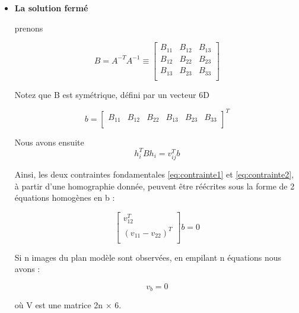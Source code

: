  \begin{itemize}[label={\Huge$\star$}]
 	\item \textbf{La solution fermé}
 	
 	prenons 
 	
 	\begin{equation}
 	B
 	=
 	A^{-T}
 	A^{-1}
 	\equiv
 	\left[ 
 	\begin{array}{ccc}
 		B_{11} & B_{12} & B_{13} \\
 		B_{12} & B_{22} & B_{23}\\
 	    B_{13} & B_{23} & B_{33} \\
 	\end{array} \right]
 	\label{eq:solution fermé1}
 	\end{equation}
 	
 Notez que B est symétrique, défini par un vecteur 6D
 
\begin{equation}
 b
 =
 \left[ 
 \begin{array}{cccccc}
B_{11} & B_{12}  & B_{22} & B_{13} & B_{23} & B_{33}\\
 \end{array} \right]^{T}
\label{eq:solution fermé 2}
\end{equation}
 	
 Nous avons ensuite
 \begin{equation}
  h_{i}^{T}Bh_{i}
  =
  v_{ij}^{T}b
  \label{eq:solution fermé 3}
\end{equation}
  
  Ainsi, les deux contraintes fondamentales \ref{eq:contrainte1} et \ref{eq:contrainte2}, à partir d'une 
  homographie donnée, peuvent être réécrites sous la forme de 2 équations homogènes en b :	
  
 \begin{equation}
  \left[ 
  \begin{array}{c}
  	 v_{12}^{T} \\
  	 (v_{11}-v_{22})^{T}\\
  \end{array} \right]b
  =
  0
\label{eq:solution fermé 4}
\end{equation}

 Si n images du plan modèle sont observées, en empilant n équations nous avons :
 
  \begin{equation}
 v_b = 0
 \label{eq:solution fermé 5}
 \end{equation}
 
 où V est une matrice 2n × 6. 
 

\end{itemize}
